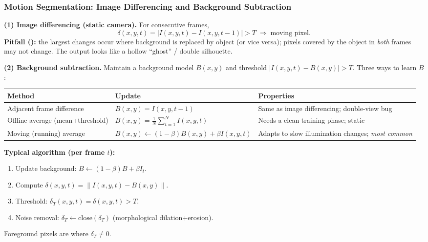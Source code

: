 \bigseparator

\subsubsection{Motion Segmentation: Image Differencing and Background Subtraction}

\textbf{(1) Image differencing (static camera).} For consecutive frames,
\[
\delta(x,y,t) = |I(x,y,t) - I(x,y,t-1)| > T \;\Rightarrow\; \text{moving pixel}.
\]
\textbf{Pitfall ():} the largest changes occur where background is replaced by object (or vice versa); pixels covered by the object in \emph{both} frames may not change. The output looks like a hollow ``ghost'' / double silhouette.

\separator

\textbf{(2) Background subtraction.} Maintain a background model $B(x,y)$ and threshold $|I(x,y,t) - B(x,y)| > T$. Three ways to learn $B$:

\begin{center}
\renewcommand{\arraystretch}{1.3}
\begin{tabular}{@{} l l p{6.5cm} @{}}
\toprule
\textbf{Method} & \textbf{Update} & \textbf{Properties} \\
\midrule
Adjacent frame difference & $B(x,y) = I(x,y,t-1)$ & Same as image differencing; double-view bug \\
Offline average (mean+threshold) & $B(x,y) = \tfrac{1}{N}\sum_{t=1}^{N} I(x,y,t)$ & Needs a clean training phase; static \\
Moving (running) average & $B(x,y) \leftarrow (1-\beta) B(x,y) + \beta I(x,y,t)$ & Adapts to slow illumination changes; \emph{most common} \\
\bottomrule
\end{tabular}
\end{center}

\textbf{Typical algorithm (per frame $t$):}
\begin{enumerate}
  \item Update background: $B \leftarrow (1-\beta) B + \beta I_t$.
  \item Compute $\delta(x,y,t) = \|I(x,y,t) - B(x,y)\|$.
  \item Threshold: $\delta_T(x,y,t) = \delta(x,y,t) > T$.
  \item Noise removal: $\delta_T \leftarrow \mathrm{close}(\delta_T)$ (morphological dilation+erosion).
\end{enumerate}
Foreground pixels are where $\delta_T \neq 0$.

